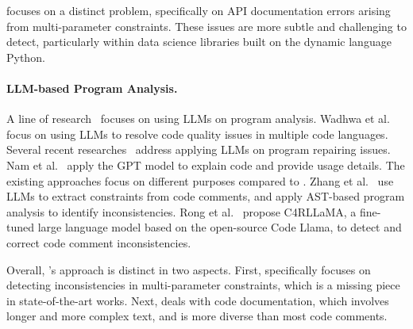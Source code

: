 \toolchecker focuses on a distinct problem, specifically on API documentation errors arising from multi-parameter constraints. These issues are more subtle and challenging to detect, particularly within data science libraries built on the dynamic language Python.


\paragraph{LLM-based Program Analysis.}
A line of research~\cite{wadhwa2024codequality,jin2023programrepair,yang2024programrepair,xia2024programrepair,nam2024codeunderstand,zhang2024codeinconsistency} focuses on using LLMs on program analysis. Wadhwa et al.~\cite{wadhwa2024codequality} focus on using LLMs to resolve code quality issues in multiple code languages. Several recent researches~\cite{jin2023programrepair, yang2024programrepair, xia2024programrepair} address applying LLMs on program repairing issues. Nam et al.~\cite{nam2024codeunderstand} apply the GPT model to explain code and provide usage details.
The existing approaches focus on different purposes compared to \toolchecker.
Zhang et al.~\cite{zhang2024codeinconsistency,zhang2024codeinconsistencyase} use LLMs to extract constraints from code comments, and apply AST-based program analysis to identify inconsistencies.
Rong et al.~\cite{rong2024code} propose C4RLLaMA, a fine-tuned large language model based on the open-source Code Llama, to detect and correct code comment inconsistencies.


Overall, \toolchecker's approach is distinct in two aspects.
First, \toolchecker specifically focuses on detecting inconsistencies in multi-parameter constraints, which is a missing piece in state-of-the-art works.
Next, \toolchecker deals with code documentation, which involves longer and more complex text, and is more diverse than most code comments.


